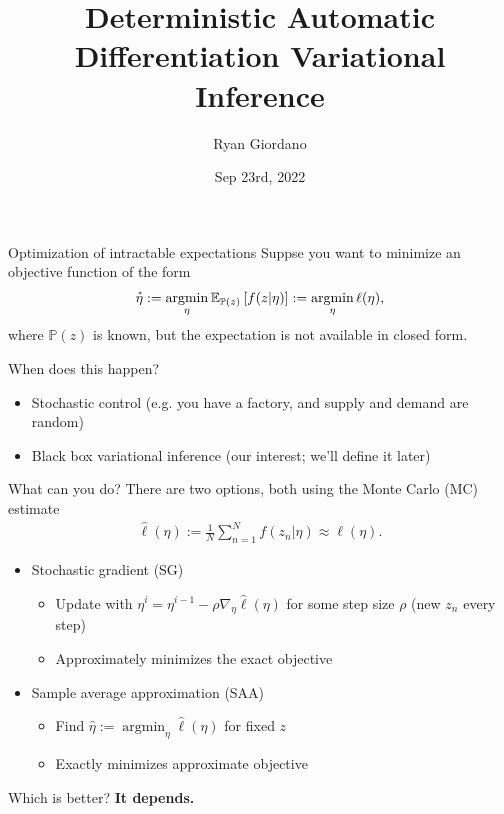 \documentclass[8pt]{beamer}\usepackage[]{graphicx}\usepackage[]{color}
\title{Deterministic Automatic Differentiation Variational Inference}
\author{Ryan Giordano}
\date{Sep 23rd, 2022}
\institute{Massachusetts Institute of Technology}
\def\p#1{\mathbb{P}\left(#1\right)}
\def\z{z}
\def\etahat{\hat{\eta}}
\def\ellhat{\hat{\ell}}
\def\sumn{\sum_{n=1}^N}
\def\meann{\frac{1}{N} \sumn}
\newcommand{\etastar}{\accentset{*}{\eta}}
\def\expect#1#2{\mathbb{E}_{#1}\left[#2\right]}
\DeclareMathOperator*{\argmin}{\mathrm{argmin}}
\begin{document}

\begin{frame}{Optimization of intractable expectations}
%
Suppse you want to minimize an objective function of the form
%
\begin{align*}
%
\etastar :=  \argmin_{\eta} \expect{\p{\z}}{f(\z | \eta)}
:= \argmin_{\eta} \ell(\eta),
%
\end{align*}
%
where $\p{\z}$ is known, but the expectation is not available in closed form.

\pause
When does this happen?
%
\begin{itemize}
%
\item Stochastic control (e.g. you have a factory, and supply and demand are
random)
%
\item Black box variational inference (our interest; we'll define it later)
%
\end{itemize}
%
\pause What can you do?  There are two options, both using the Monte Carlo (MC)
estimate
%
\begin{align*}
%
\ellhat(\eta) := \meann f(z_n | \eta) \approx \ell(\eta).
%
\end{align*}
%
\pause
%
\begin{itemize}
%
\item Stochastic gradient (SG)
%
\begin{itemize}
%
\item Update with $\eta^{i} = \eta^{i-1} - \rho \nabla_\eta \ellhat(\eta)$
for some step size $\rho$ (new $\z_n$ every step)
\item Approximately minimizes the exact objective
%
\end{itemize}
%
\pause
\item Sample average approximation (SAA)
%
\begin{itemize}
%
\item Find $\etahat := \argmin_{\eta} \ellhat(\eta)$ for fixed $\z$
\item Exactly minimizes approximate objective
%
\end{itemize}
%
\end{itemize}
%
\pause
Which is better? \textbf{It depends.}
%
\end{frame}
\end{document}
